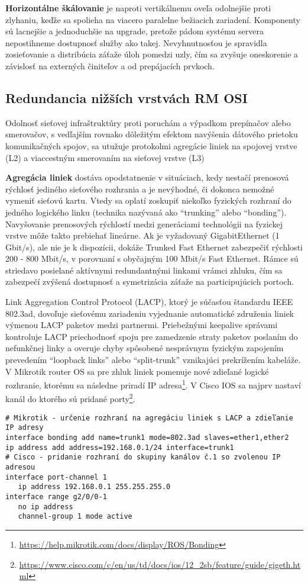 \documentclass[12pt, a4paper]{article}
\begin{document}
\textbf{Horizontálne škálovanie} je naproti vertikálnemu oveľa odolnejšie proti zlyhaniu, keďže sa spolieha 
na viacero paralelne bežiacich zariadení. Komponenty sú lacnejšie a jednoduchšie na upgrade, 
pretože pádom systému servera nepostihneme dostupnosť služby ako takej. Nevyhnutnosťou je spravidla 
zosieťovanie a distribúcia záťaže úloh pomedzi uzly, čím sa zvyšuje oneskorenie a závislosť na externých 
činiteľov a od prepájacích prvkoch.

\subsection{Redundancia nižších vrstvách RM OSI}
Odolnosť sieťovej infraštruktúry proti poruchám a výpadkom prepínačov alebo smerovačov, s vedľajším
rovnako dôležitým efektom navýšenia dátového prietoku komunikačných spojov, sa utužuje protokolmi
agregácie liniek na spojovej vrstve (L2) a viaccestným smerovaním na sieťovej vrstve (L3) 

\textbf{Agregácia liniek} dostáva opodstatnenie v situáciach, kedy nestačí prenosová rýchlosť
jediného sieťového rozhrania a je nevýhodné, či dokonca nemožné vymeniť sieťovú kartu.
Vtedy sa oplatí zoskupiť niekoľko fyzických rozhraní do jedného logického linku (technika 
nazývaná ako \enquote{trunking} alebo \enquote{bonding}). Navyšovanie prenosových rýchlostí
medzi generáciami technológii na fyzickej vrstve môže takto prebiehať lineárne. Ak je vyžadovaný
GigabitEthernet (1 Gbit/s), ale nie je k dispozícii, dokáže Trunked Fast Ethernet
zabezpečiť rýchlosti 200 - 800 Mbit/s, v porovnaní s obyčajným 100 Mbit/s Fast Ethernet. 
Rámce sú striedavo posielané aktívnymi redundantnými linkami vrámci zhluku, čím
sa zabezpečí zvýšená dostupnosť a symetrizácia záťaže na participujúcich portoch.

Link Aggregation Control Protocol (LACP), ktorý je súčasťou štandardu IEEE 802.3ad, dovoľuje sieťovému 
zariadeniu vyjednanie automatické združenia liniek výmenou LACP paketov medzi partnermi.
Priebežnými keepalive správami kontroluje LACP priechodnosť spoju pre zamedzenie straty paketov
poslaním do nefunkčnej linky a overuje chyby spôsobené nesprávnym fyzickým zapojením prevedením
\enquote{loopback links} alebo \enquote{split-trunk} vznikajúci prekrížením kabeláže. V Mikrotik
router OS sa pre zhluk liniek pomenuje nové zdieľané logické rozhranie, ktorému sa následne
priradí IP adresa\footnote{\url{https://help.mikrotik.com/docs/display/ROS/Bonding}}.
V Cisco IOS sa najprv nastaví kanál do ktorého sú pridané porty\footnote{\url{https://www.cisco.com/c/en/us/td/docs/ios/12_2sb/feature/guide/gigeth.html}}.
\begin{lstlisting}
# Mikrotik - určenie rozhraní na agregáciu liniek s LACP a zdieľanie IP adresy
interface bonding add name=trunk1 mode=802.3ad slaves=ether1,ether2
ip address add address=192.168.0.1/24 interface=trunk1
# Cisco - pridanie rozhraní do skupiny kanálov č.1 so zvolenou IP adresou
interface port-channel 1
   ip address 192.168.0.1 255.255.255.0
interface range g2/0/0-1
   no ip address
   channel-group 1 mode active
\end{lstlisting}
\end{document}
